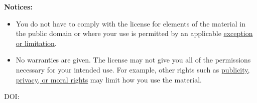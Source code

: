 \begin{flushleft}
\begin{small}
\textbf{Notices:}

\begin{itemize}
\tightlist
\item You do not have to comply with the license for elements of the material in the public domain or where your use is permitted by an applicable \href{https://creativecommons.org/licenses/by-nc-nd/4.0/?ref=chooser-v1#ref-exception-or-limitation}{exception or limitation}.\\
\item No warranties are given. The license may not give you all of the permissions necessary for your intended use. For example, other rights such as \href{https://creativecommons.org/licenses/by-nc-nd/4.0/?ref=chooser-v1#ref-publicity-privacy-or-moral-rights}{publicity, privacy, or moral rights} may limit how you use the material.
\end{itemize}

\vspace{5mm}
DOI: 
\end{small}
\end{flushleft}
